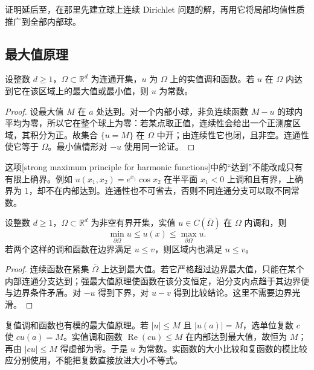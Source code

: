 证明延后至，在那里先建立球上连续 Dirichlet 问题的解，再用它将局部均值性质推广到全部内部球。

\subsection{最大值原理}
\label{b2:subsec:130102}

\begin{theorem}[调和函数的强最大值原理]\label{b2:thm:13-strong-maximum}
设整数 \(d\geq1\)，\(\Omega\subset\mathbb R^d\) 为连通开集，\(u\) 为 \(\Omega\) 上的实值调和函数。若 \(u\) 在 \(\Omega\) 内达到它在该区域上的最大值或最小值，则 \(u\) 为常数。
\end{theorem}
\begin{proof}
设最大值 \(M\) 在 \(a\) 处达到。对一个内部小球，非负连续函数 \(M-u\) 的球内平均为零，所以它在整个球上为零：若某点取正值，连续性会给出一个正测度区域，其积分为正。故集合 \(\{u=M\}\) 在 \(\Omega\) 中开；由连续性它也闭，且非空。连通性使它等于 \(\Omega\)。最小值情形对 \(-u\) 使用同一论证。
\end{proof}

这项[strong maximum principle for harmonic functions]中的“达到”不能改成只有有限上确界。例如 \(u(x_1,x_2)=e^{x_1}\cos x_2\) 在半平面 \(x_1<0\) 上调和且有界，上确界为 \(1\)，却不在内部达到。连通性也不可省去，否则不同连通分支可以取不同常数。

\begin{corollary}[边界最大值与比较]\label{b2:cor:13-boundary-maximum}
设整数 \(d\geq1\)，\(\Omega\subset\mathbb R^d\) 为非空有界开集，实值 \(u\in C(\overline\Omega)\) 在 \(\Omega\) 内调和，则
\[
 \min_{\partial\Omega}u\leq u(x)\leq\max_{\partial\Omega}u.
\]
若两个这样的调和函数在边界满足 \(u\leq v\)，则区域内也满足 \(u\leq v\)。
\end{corollary}
\begin{proof}
连续函数在紧集 \(\overline\Omega\) 上达到最大值。若它严格超过边界最大值，只能在某个内部连通分支达到；强最大值原理使函数在该分支恒定，沿分支内点趋于其边界便与边界条件矛盾。对 \(-u\) 得到下界，对 \(u-v\) 得到比较结论。这里不需要边界光滑。
\end{proof}

复值调和函数也有模的最大值原理。若 \(|u|\leq M\) 且 \(|u(a)|=M\)，选单位复数 \(c\) 使 \(cu(a)=M\)。实值调和函数 \(\operatorname{Re}(cu)\leq M\) 在内部达到最大值，故恒为 \(M\)；再由 \(|cu|\leq M\) 得虚部为零。于是 \(u\) 为常数。实函数的大小比较和复函数的模比较应分别使用，不能把复数直接放进大小不等式。

